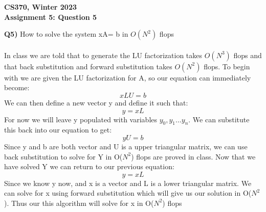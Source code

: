 \documentclass[12pt]{article}
\begin{document}
\begin{center}
{\Large\textbf{CS370, Winter 2023}}\\
\vspace{2mm}
{\Large\textbf{Assignment 5: Question 5}}\\
\vspace{3mm}
\end{center}

\begin{adjustwidth}{0em}{0pt}
\textbf{Q5)} How to solve the system xA= b in $O(N^2)$ flops \\\\
In class we are told that to generate the LU factorization takes $O(N^3)$ flops and that back substitution and forward substitution takes $O(N^2)$ flops. To begin with we are given the LU factorization for A, so our equation can immediately become:
\[ xLU = b \]
We can then define a new vector y and define it such that:
\[ y = xL \]
For now we will leave y populated with variables $y_0, y_1 ... y_n$. We can substitute this back into our equation to get:
\[ yU = b \]
Since y and b are both vector and U is a upper triangular matrix, we can use back substitution to solve for Y in O($N^2$) flops are proved in class. Now that we have solved Y we can return to our previous equation:
\[ y = xL \]
Since we know y now, and x is a vector and L is a lower triangular matrix. We can solve for x using forward substitution which will give us our solution in O($N^2$). Thus our this algorithm will solve for x in O($N^2$) flops

\end{adjustwidth}
\end{document}
